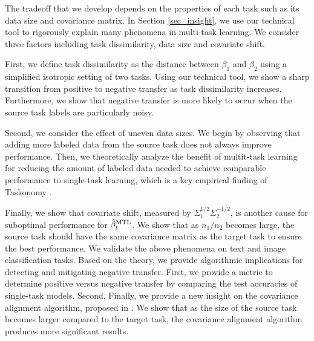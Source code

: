 The tradeoff that we develop depends on the properties of each task such as its data size and covariance matrix.
In Section \ref{sec_insight}, we use our technical tool to rigorously explain many phenomena in multi-task learning.
We consider three factors including task dissimilarity, data size and covariate shift.
\squishlist
		\item First, we define task dissimilarity as the distance between $\beta_1$ and $\beta_2$ using a simplified isotropic setting of two tasks.
		Using our technical tool, we show a sharp transition from positive to negative transfer as task dissimilarity increases.
		Furthermore, we show that negative transfer is more likely to occur when the source task labels are particularly noisy.
		\item Second, we consider the effect of uneven data sizes.
	We begin by observing that adding more labeled data from the source task does not always improve performance.
	Then, we theoretically analyze the benefit of multit-task learning for reducing the amount of labeled data needed to achieve comparable performance to single-task learning, which is a key empirical finding of Taskonomy \cite{ZSSGM18}.
		\item Finally, we show that covariate shift, measured by $\Sigma_1^{1/2}\Sigma_2^{-1/2}$, is another cause for suboptimal performance for $\hat{\beta}_t^{\text{MTL}}$.
		We show that as $n_1 / n_2$ becomes large, the source task should have the same covariance matrix as the target task to ensure the best performance.
\squishend
We validate the above phenomena on text and image classification tasks.
Based on the theory, we provide algorithmic implications for detecting and mitigating negative transfer.
First, we provide a metric to determine positive versus negative transfer by comparing the test accuracies of single-task models.
Second, \todo{}
Finally, we provide a new insight on the covariance alignment algorithm, proposed in \cite{WZR20}.
We show that as the size of the source task becomes larger compared to the target task, the covariance alignment algorithm produces more significant results.

